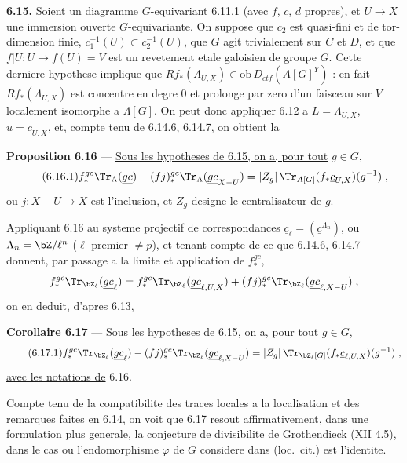 \medskip
\noindent\textbf{6.15.} Soient un diagramme $G$-equivariant 6.11.1 (avec $f$, $c$, $d$ propres), et $U \longrightarrow X$ une immersion ouverte $G$-equivariante. On suppose que $c_2$ est quasi-fini et de tor-dimension finie, $c_1^{-1}(U) \subset c_2^{-1}(U)$, que $G$ agit trivialement sur $C$ et $D$, et que $f|U : U \longrightarrow f(U) = V$ est un revetement etale galoisien de groupe $G$. Cette derniere hypothese implique que $Rf_*(\Lambda_{U,X}) \in \mathrm{ob}\, D_{ctf}(A[G]^Y)$ : en fait $Rf_*(\Lambda_{U,X})$ est concentre en degre $0$ et prolonge par zero d'un faisceau sur $V$ localement isomorphe a $\Lambda[G]$. On peut donc appliquer 6.12 a $L = \Lambda_{U,X}$, $u = \underline{c}_{U,X}$, et, compte tenu de 6.14.6, 6.14.7, on obtient la

\medskip
\noindent\textbf{Proposition 6.16} --- \underline{Sous les hypotheses de 6.15, on a, pour tout} $g \in G$,
\begin{equation}\tag{6.16.1}
f_*^{gc}\Tr_\Lambda(\underline{gc}) - (fj)_*^{gc}\Tr_\Lambda(\underline{gc}_{X-U}) = |Z_g|\,\Tr_{A[G]}(f_*\underline{c}_{U,X})(g^{-1})\;,
\end{equation}
\underline{ou} $j : X-U \longrightarrow X$ \underline{est l'inclusion, et} $Z_g$ \underline{designe le centralisateur de} $g$.

\medskip
Appliquant 6.16 au systeme projectif de correspondances $\underline{c}_\ell = (\underline{c}^{\Lambda_n})$, ou $\Lambda_n = \bZ/\ell^n$ ($\ell$ premier $\not= p$), et tenant compte de ce que 6.14.6, 6.14.7 donnent, par passage a la limite et application de $f_*^{gc}$,
\[
f_*^{gc}\Tr_{\bZ_\ell}(\underline{gc}_\ell) = f_*^{gc}\Tr_{\bZ_\ell}(\underline{gc}_{\ell,U,X}) + (fj)_*^{gc}\Tr_{\bZ_\ell}(\underline{gc}_{\ell,X-U})\;,
\]
on en deduit, d'apres 6.13,

\medskip
\noindent\textbf{Corollaire 6.17} --- \underline{Sous les hypotheses de 6.15, on a, pour tout} $g \in G$,
\begin{equation}\tag{6.17.1}
f_*^{gc}\Tr_{\bZ_\ell}(\underline{gc}_\ell) - (fj)_*^{gc}\Tr_{\bZ_\ell}(\underline{gc}_{\ell,X-U}) = |Z_g|\,\Tr_{\bZ_\ell[G]}(f_*\underline{c}_{\ell,U,X})(g^{-1})\;,
\end{equation}
\underline{avec les notations de} 6.16.

\medskip
Compte tenu de la compatibilite des traces locales a la localisation et des remarques faites en 6.14, on voit que 6.17 resout affirmativement, dans une formulation plus generale, la conjecture de divisibilite de Grothendieck (XII 4.5), dans le cas ou l'endomorphisme $\varphi$ de $G$ considere dans (loc.\ cit.) est l'identite.

